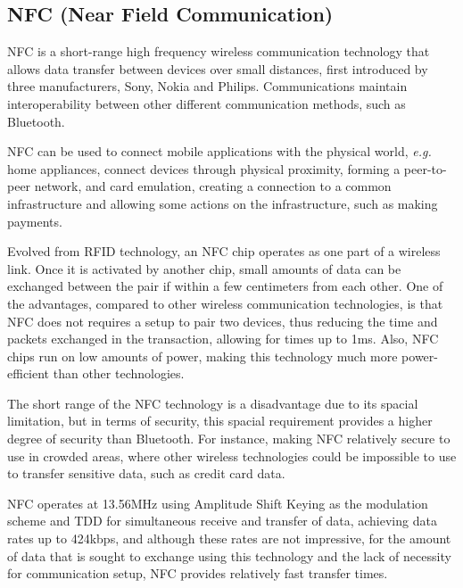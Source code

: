 \subsection{NFC (Near Field Communication)}
\label{subsection:nfc}

\gls{NFC} is a short-range high frequency wireless communication technology that allows data transfer between devices over small distances, first introduced by three manufacturers, Sony, Nokia and Philips. Communications maintain interoperability between other different communication methods, such as Bluetooth.

\gls{NFC} can be used to connect mobile applications with the physical world, \textit{e.g.} home appliances, connect devices through physical proximity, forming a peer-to-peer network, and card emulation, creating a connection to a common infrastructure and allowing some actions on the infrastructure, such as making payments.

Evolved from \gls{RFID} technology, an \gls{NFC} chip operates as one part of a wireless link. Once it is activated by another chip, small amounts of data can be exchanged between the pair if within a few centimeters from each other. One of the advantages, compared to other wireless communication technologies, is that \gls{NFC} does not requires a setup to pair two devices, thus reducing the time and packets exchanged in the transaction, allowing for times up to 1ms. Also, \gls{NFC} chips run on low amounts of power, making this technology much more power-efficient than other technologies.

The short range of the \gls{NFC} technology is a disadvantage due to its spacial limitation, but in terms of security, this spacial requirement provides a higher degree of security than Bluetooth. For instance, making \gls{NFC} relatively secure to use in crowded areas, where other wireless technologies could be impossible to use to transfer sensitive data, such as credit card data.

\gls{NFC} operates at 13.56MHz using Amplitude Shift Keying as the modulation scheme and \gls{TDD} for simultaneous receive and transfer of data, achieving data rates up to 424kbps, and although these rates are not impressive, for the amount of data that is sought to exchange using this technology and the lack of necessity for communication setup, \gls{NFC} provides relatively fast transfer times.






